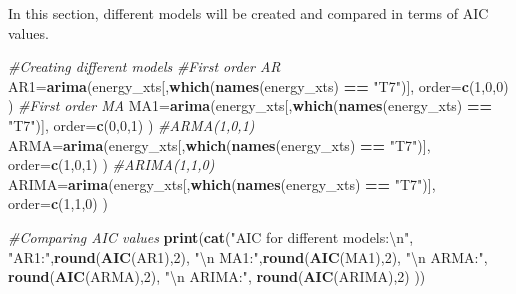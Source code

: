 \documentclass[]{article}
\newenvironment{Shaded}{\begin{snugshade}}{\end{snugshade}}
\newcommand{\KeywordTok}[1]{\textcolor[rgb]{0.13,0.29,0.53}{\textbf{#1}}}
\newcommand{\DataTypeTok}[1]{\textcolor[rgb]{0.13,0.29,0.53}{#1}}
\newcommand{\DecValTok}[1]{\textcolor[rgb]{0.00,0.00,0.81}{#1}}
\newcommand{\CharTok}[1]{\textcolor[rgb]{0.31,0.60,0.02}{#1}}
\newcommand{\StringTok}[1]{\textcolor[rgb]{0.31,0.60,0.02}{#1}}
\newcommand{\CommentTok}[1]{\textcolor[rgb]{0.56,0.35,0.01}{\textit{#1}}}
\newcommand{\OperatorTok}[1]{\textcolor[rgb]{0.81,0.36,0.00}{\textbf{#1}}}
\newcommand{\NormalTok}[1]{#1}
\begin{document}
In this section, different models will be created and compared in terms
of AIC values.

\begin{Shaded}
\begin{Highlighting}[]
\CommentTok{#Creating different models}
\CommentTok{#First order AR}
\NormalTok{AR1=}\KeywordTok{arima}\NormalTok{(energy_xts[,}\KeywordTok{which}\NormalTok{(}\KeywordTok{names}\NormalTok{(energy_xts) }\OperatorTok{==}\StringTok{ "T7"}\NormalTok{)], }\DataTypeTok{order=}\KeywordTok{c}\NormalTok{(}\DecValTok{1}\NormalTok{,}\DecValTok{0}\NormalTok{,}\DecValTok{0}\NormalTok{) )}
\CommentTok{#First order MA}
\NormalTok{MA1=}\KeywordTok{arima}\NormalTok{(energy_xts[,}\KeywordTok{which}\NormalTok{(}\KeywordTok{names}\NormalTok{(energy_xts) }\OperatorTok{==}\StringTok{ "T7"}\NormalTok{)], }\DataTypeTok{order=}\KeywordTok{c}\NormalTok{(}\DecValTok{0}\NormalTok{,}\DecValTok{0}\NormalTok{,}\DecValTok{1}\NormalTok{) )}
\CommentTok{#ARMA(1,0,1)}
\NormalTok{ARMA=}\KeywordTok{arima}\NormalTok{(energy_xts[,}\KeywordTok{which}\NormalTok{(}\KeywordTok{names}\NormalTok{(energy_xts) }\OperatorTok{==}\StringTok{ "T7"}\NormalTok{)], }\DataTypeTok{order=}\KeywordTok{c}\NormalTok{(}\DecValTok{1}\NormalTok{,}\DecValTok{0}\NormalTok{,}\DecValTok{1}\NormalTok{) )}
\CommentTok{#ARIMA(1,1,0)}
\NormalTok{ARIMA=}\KeywordTok{arima}\NormalTok{(energy_xts[,}\KeywordTok{which}\NormalTok{(}\KeywordTok{names}\NormalTok{(energy_xts) }\OperatorTok{==}\StringTok{ "T7"}\NormalTok{)], }\DataTypeTok{order=}\KeywordTok{c}\NormalTok{(}\DecValTok{1}\NormalTok{,}\DecValTok{1}\NormalTok{,}\DecValTok{0}\NormalTok{) )}

\CommentTok{#Comparing AIC values}
\KeywordTok{print}\NormalTok{(}\KeywordTok{cat}\NormalTok{(}\StringTok{"AIC for different models:}\CharTok{\textbackslash{}n}\StringTok{"}\NormalTok{, }\StringTok{"AR1:"}\NormalTok{,}\KeywordTok{round}\NormalTok{(}\KeywordTok{AIC}\NormalTok{(AR1),}\DecValTok{2}\NormalTok{), }\StringTok{"}\CharTok{\textbackslash{}n}\StringTok{ MA1:"}\NormalTok{,}\KeywordTok{round}\NormalTok{(}\KeywordTok{AIC}\NormalTok{(MA1),}\DecValTok{2}\NormalTok{), }
            \StringTok{"}\CharTok{\textbackslash{}n}\StringTok{ ARMA:"}\NormalTok{, }\KeywordTok{round}\NormalTok{(}\KeywordTok{AIC}\NormalTok{(ARMA),}\DecValTok{2}\NormalTok{), }\StringTok{"}\CharTok{\textbackslash{}n}\StringTok{ ARIMA:"}\NormalTok{, }\KeywordTok{round}\NormalTok{(}\KeywordTok{AIC}\NormalTok{(ARIMA),}\DecValTok{2}\NormalTok{) ))}
\end{Highlighting}
\end{Shaded}
\end{document}
